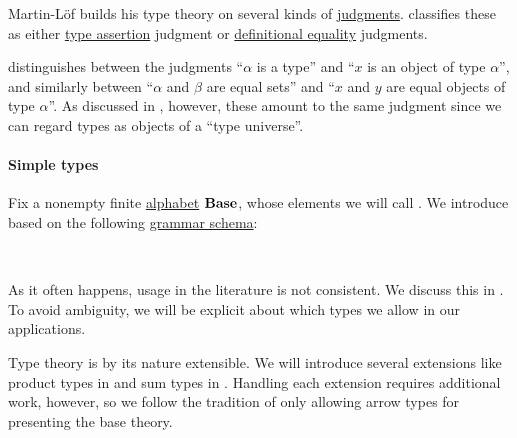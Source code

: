 \begin{remark}\label{rem:type_theory_judgments}
  Martin-L\"of builds his type theory on several kinds of \hyperref[con:judgment]{judgments}. \cite[19]{UnivalentProject2024OctoberHoTT} classifies these as either \hyperref[def:type_assertion]{type assertion} judgment or \hyperref[con:definitional_equality]{definitional equality} judgments.

   distinguishes between the judgments \enquote{\( \alpha \) is a type} and \enquote{\( x \) is an object of type \( \alpha \)}, and similarly between \enquote{\( \alpha \) and \( \beta \) are equal sets} and \enquote{\( x \) and \( y \) are equal objects of type \( \alpha \)}. As discussed in , however, these amount to the same judgment since we can regard types as objects of a \enquote{type universe}.
\end{remark}

\paragraph{Simple types}

\begin{definition}\label{def:simple_type}
  Fix a nonempty finite \hyperref[def:formal_language/alphabet]{alphabet} \( \op*{Base} \), whose elements we will call . We introduce  based on the following \hyperref[def:formal_grammar/schema]{grammar schema}:
  \begin{bnf*}
       {\bnftsq{(} \bnfsp {} \bnfsp \bnftsq{\( \synimplies \)} \bnfsp {} \bnfsp \bnftsq{)}} \\
             { \bnfor {} \bnfor {} \bnfor {}}
  \end{bnf*}
\end{definition}
\begin{comments}
  \item As it often happens, usage in the literature is not consistent. We discuss this in . To avoid ambiguity, we will be explicit about which types we allow in our applications.

  \item Type theory is by its nature extensible. We will introduce several extensions like product types in  and sum types in . Handling each extension requires additional work, however, so we follow the tradition of only allowing arrow types for presenting the base theory.
\end{comments}


